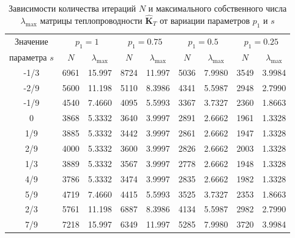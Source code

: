\begin{table}[htbp]
    \centering
    \begin{threeparttable}%
        \caption{Зависимости количества итераций $N$ и максимального собственного числа $\lambda_{\max}$ матрицы теплопроводности $\widehat{\textbf{K}}_T$ от вариации параметров $p_1$ и $s$}\label{tab:ThermalIterAndMaxEgien}
        \begin{tabular}{|c|c|c|c|c|c|c|c|c|}
			\hline
			Значение & \multicolumn{2}{c|}{$p_1 = 1$} & \multicolumn{2}{c|}{$p_1 = 0.75$} & \multicolumn{2}{c|}{$p_1 = 0.5$} & \multicolumn{2}{c|}{$p_1 = 0.25$} \\ 
			\cline{2-9}
			параметра $s$ & $N$  & $\lambda_{\max}$ & $N$  & $\lambda_{\max}$ & $N$  & $\lambda_{\max}$ & $N$  & $\lambda_{\max}$ \\ 
			\hline
			-1/3 & 6961 & 15.997 & 8724 & 11.997 & 5036 & 7.9980 & 3549 & 3.9984 \\
			\hline
			-2/9 & 5600 & 11.198 & 5110 & 8.3986 & 4341 & 5.5987 & 2948 & 2.7990 \\
			\hline
			-1/9 & 4540 & 7.4660 & 4095 & 5.5993 & 3367 & 3.7327 & 2360 & 1.8663 \\
			\hline
			   0 & 3868 & 5.3332 & 3640 & 3.9997 & 2891 & 2.6662 & 1961 & 1.3328 \\
			\hline
			 1/9 & 3885 & 5.3332 & 3442 & 3.9997 & 2861 & 2.6662 & 1947 & 1.3328 \\
			\hline 
			 2/9 & 4000 & 5.3332 & 3600 & 3.9997 & 2826 & 2.6662 & 2003 & 1.3328 \\
			\hline 
			 1/3 & 3889 & 5.3332 & 3567 & 3.9997 & 2778 & 2.6662 & 1948 & 1.3328 \\
			\hline 
			 4/9 & 3786 & 5.3332 & 3474 & 3.9997 & 2835 & 2.6662 & 1982 & 1.3328 \\
			\hline 
			 5/9 & 4719 & 7.4660 & 4415 & 5.5993 & 3525 & 3.7327 & 2353 & 1.8663 \\
			\hline 
			 2/3 & 5761 & 11.198 & 6887 & 8.3986 & 4134 & 5.5987 & 2982 & 2.7990 \\
			\hline 
			 7/9 & 7218 & 15.997 & 6349 & 11.997 & 5285 & 7.9980 & 3720 & 3.9984 \\
			\hline
        \end{tabular}
    \end{threeparttable}
\end{table}


